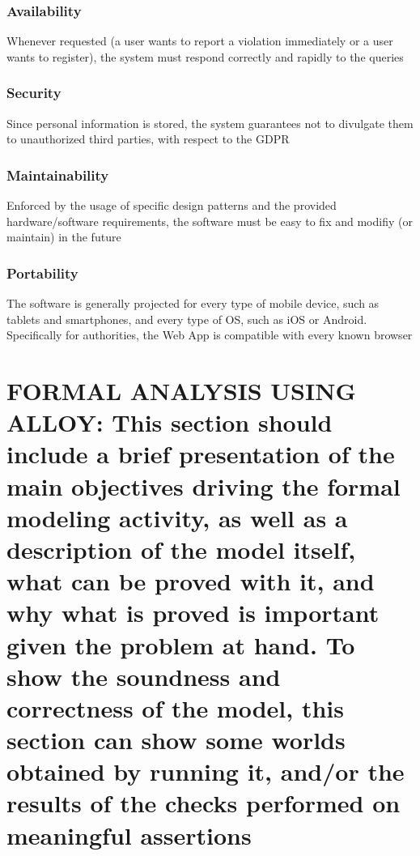 \documentclass[12pt,a4paper]{article}
\begin{document}
\subsubsection{Availability}
Whenever requested (a user wants to report a violation immediately or a user wants to register), the system must respond correctly and rapidly to the queries
\subsubsection{Security}
Since personal information is stored, the system guarantees not to divulgate them to unauthorized third parties, with respect to the GDPR
\subsubsection{Maintainability}
Enforced by the usage of specific design patterns and the provided hardware/software requirements, the software must be easy to fix and modifiy (or maintain) in the future
\subsubsection{Portability}
The software is generally projected for every type of mobile device, such as tablets and smartphones, and every type of OS, such as iOS or Android. Specifically for authorities, the Web App is compatible with every known browser  
\section{FORMAL ANALYSIS USING ALLOY: This section should include a brief presentation of the 
main objectives driving the formal modeling activity, as well as a description of the model 
itself, what can be proved with it, and why what is proved is important given the problem at 
hand. To show  the soundness and correctness of the model,  this section can show some
worlds obtained by running it, and/or the results of the checks performed on meaningful 
assertions}
\end{document}
